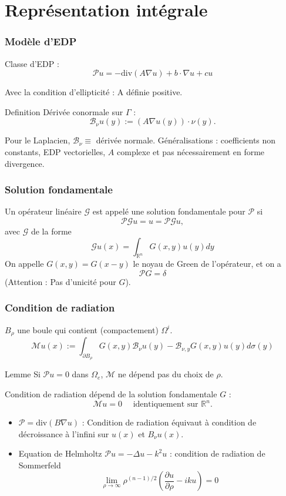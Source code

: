 \documentclass[11pt]{beamer}
\begin{document}
	\section{Représentation intégrale}
	\setcounter{subsection}{1}
	\begin{frame}
		\frametitle{Modèle d'EDP}
		\begin{block}{Classe d'EDP :}			
			\[\mathcal{P}u = - \text{div}(A \nabla u) + b\cdot \nabla u + c u\]
		\end{block}		
		Avec la condition d'ellipticité : A définie positive. 
		\begin{block}{Definition}
			Dérivée conormale sur $\Gamma$ :
			\[ \mathcal{B}_\nu u(y) := \left(A\nabla u(y)\right) \cdot \nu(y).\]
		\end{block}
		Pour le Laplacien, $\mathcal{B}_\nu \equiv$ dérivée normale. 
		Généralisations : coefficients non constants, EDP vectorielles, $A$ complexe et pas nécessairement en forme divergence. 		
	\end{frame}
	\begin{frame}
		\frametitle{Solution fondamentale}
		Un opérateur linéaire $\mathcal{G}$ est appelé une solution fondamentale pour $\mathcal{P}$ si
		\[\mathcal{P}\mathcal{G}u = u = \mathcal{P}\mathcal{G}u,\]
		avec $\mathcal{G}$ de la forme 
		\[ \mathcal{G}u(x) = \int_{\mathbb{R}^n} G(x,y) u(y) dy\]
		On appelle $G(x,y) = G(x-y)$ le noyau de Green de l'opérateur, et on a 
		\[ \mathcal{P}G = \delta\]
		(Attention : Pas d'unicité pour $G$). 
	\end{frame}
	\begin{frame}
		\frametitle{Condition de radiation}
		$B_\rho$ une boule qui contient (compactement) $\Omega^i$. 
		\[\mathcal{M}u(x) := \int_{\partial B_\rho} G(x,y) \mathcal{B}_\nu u(y) - \mathcal{B}_{\nu,y}G(x,y)u(y)d\sigma(y) \]
		\begin{block}{Lemme}
			Si $\mathcal{P}u = 0$ dans $\Omega_e$, $\mathcal{M}$ ne dépend pas du choix de $\rho$. 
		\end{block}
		Condition de radiation dépend de la solution fondamentale $G$ : 
		\[ \mathcal{M}u = 0 \quad \text{ identiquement sur } \mathbb{R}^n.\] 
		\vspace{-0.5cm}
		\begin{itemize}
			\item $\mathcal{P} = \text{div}(B \nabla u)$ : Condition de radiation équivaut à condition de décroissance à l'infini sur $u(x)$ et $B_\nu u(x)$. 
			\item Equation de Helmholtz $\mathcal{P}u = -\Delta u - k^2 u$ : condition de radiation de Sommerfeld 
			\[ \lim_{\rho \to \infty} \rho^{(n-1)/2} \left(\frac{\partial u}{\partial \rho} - iku \right) = 0\]
		\end{itemize}
	
	\end{frame}
\end{document}

